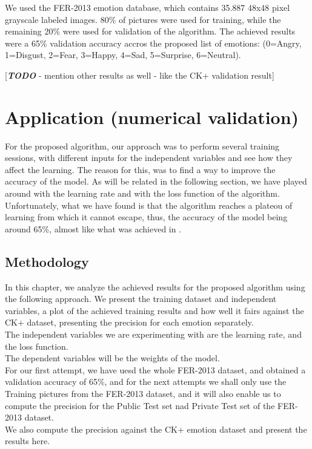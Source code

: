 \documentclass[runningheads,a4paper,11pt]{report}
\begin{document}
We used the FER-2013 emotion database, which contains 35.887 48x48 pixel grayscale labeled images. 80\% of pictures were used for training, while the remaining 20\% were used for validation of the algorithm. The achieved results were a 65\% validation accuracy accros the proposed list of emotions: (0=Angry, 1=Disgust, 2=Fear, 3=Happy, 4=Sad, 5=Surprise, 6=Neutral).

[\textbf{\emph{TODO}} - mention other results as well - like the CK+ validation result]


\chapter{Application (numerical validation)}
\label{chapter:application}

For the proposed algorithm, our approach was to perform several training sessions, with different inputs for the independent variables and see how they affect the learning. The reason for this, was to find a way to improve the accuracy of the model. As will be related in the following section, we have played around with the learning rate and with the loss function of the algorithm. Unfortunately, what we have found is that the algorithm reaches a plateou of learning from which it cannot escape, thus, the accuracy of the model being around 65\%, almost like what was achieved in \cite{Arriaga17}.

\section{Methodology}
\label{section:meth}
In this chapter, we analyze the achieved results for the proposed algorithm using the following approach. We present the training dataset and independent variables, a plot of the achieved training results and how well it fairs against the CK+ dataset, presenting the precision for each emotion separately.\\
The independent variables we are experimenting with are the learning rate, and the loss function.\\
The dependent variables will be the weights of the model.\\
For our first attempt, we have uesd the whole FER-2013 dataset, and obtained a validation accuracy of 65\%, and for the next attempts we shall only use the Training pictures from the FER-2013 dataset, and it will also enable us to compute the precision for the Public Test set nad Private Test set of the FER-2013 dataset.\\
We also compute the precision against the CK+ emotion dataset and present the results here.
\end{document}
